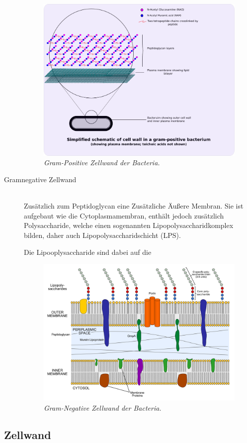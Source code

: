 \begin{description}
		\begin{figure}[ht!]
		\leavevmode
		\begin{center}
		\includegraphics[scale=0.27]{./pictures/gram_positive_zw}
		\end{center}
		\caption{\slshape{Gram-Positive Zellwand der Bacteria.}}
		\label{fig:gramPosBacZW}
		\end{figure}

	\item[Gramnegative Zellwand] \hfill \\
		Zusätzlich zum Peptidoglycan eine Zusätzliche Äußere Membran.
		Sie ist aufgebaut wie die Cytoplasmamembran,
		enthält jedoch zusätzlich Polysaccharide,
		welche einen sogenannten Lipopolysaccharidkomplex bilden,
		daher auch Lipopolysaccharidschicht (LPS).

		Die Lipooplysaccharide sind dabei auf die 
		
		\begin{figure}[ht!]
		\leavevmode
		\begin{center}
			\includegraphics[scale=0.25]{./pictures/gram_negative_zw_noLegend}
		\end{center}
		\caption{\slshape{Gram-Negative Zellwand der Bacteria.}}
		\label{fig:gramNegBacZW}
		\end{figure}
\end{description}

\subsection{Zellwand}
